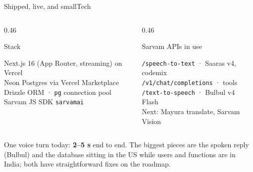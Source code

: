 \documentclass[aspectratio=169,10pt]{beamer}
\newcommand{\lbl}[1]{{\color{muted}\footnotesize #1}}
\begin{document}
\begin{frame}{Shipped, live, and small}{Tech}
  \begin{columns}[T]
    \begin{column}{0.46\textwidth}
      \begin{appcard}
        \small
        \lbl{Stack}\par\vspace{3pt}
        Next.js 16 (App Router, streaming) on Vercel\\
        Neon Postgres via Vercel Marketplace\\
        Drizzle ORM · \texttt{pg} connection pool\\
        Sarvam JS SDK \texttt{sarvamai}
      \end{appcard}
    \end{column}
    \begin{column}{0.46\textwidth}
      \begin{appcard}
        \small
        \lbl{Sarvam APIs in use}\par\vspace{3pt}
        \texttt{/speech-to-text} · Saaras v4, codemix\\
        \texttt{/v1/chat/completions} · tools\\
        \texttt{/text-to-speech} · Bulbul v4 Flash\\
        {\color{muted}Next: Mayura translate, Sarvam Vision}
      \end{appcard}
    \end{column}
  \end{columns}
  \vspace{10pt}
  {\small One voice turn today: \textbf{2–5 s} end to end. The biggest pieces are the spoken reply (Bulbul) and the database sitting in the US while users and functions are in India; both have straightforward fixes on the roadmap.}
\end{frame}
\end{document}
